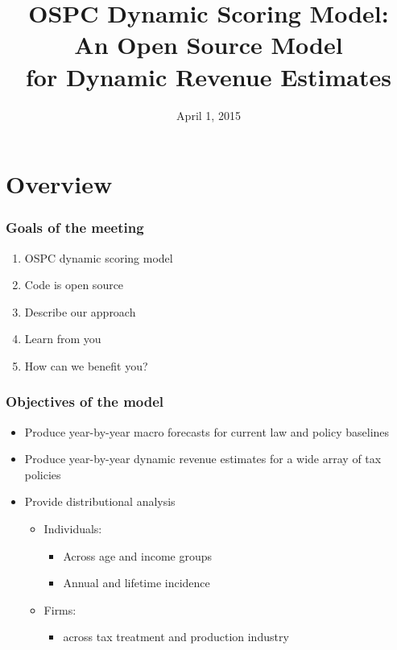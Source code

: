 \documentclass{beamer}
\title[OSPC Dynamic Scoring Model]
{OSPC Dynamic Scoring Model: \\
An Open Source Model \\ for Dynamic Revenue Estimates}
\date[Short Occasion] %
{April 1, 2015}
\begin{document}
\begin{frame}
  \titlepage
\end{frame}


\section{Overview}

\begin{frame}
\frametitle{Goals of the meeting}
  \begin{enumerate}
    \item OSPC dynamic scoring model
    \vspace{5mm}
    \item Code is open source
    \vspace{5mm}
    \item Describe our approach
    \vspace{5mm}
    \item Learn from you
    \vspace{5mm}
    \item How can we benefit you?
  \end{enumerate}
\end{frame}

\begin{frame}
\frametitle{Objectives of the model}
  \begin{itemize}
    \item Produce year-by-year macro forecasts for current law and policy baselines
    \vspace{3mm}
    \item Produce year-by-year dynamic revenue estimates for a wide array of tax policies
    \vspace{3mm}
    \item Provide distributional analysis
      \vspace{2mm}
    	\begin{itemize}
        \item Individuals:
    		  \begin{itemize}
    		    \item Across age and income groups
    		    \vspace{1mm}
            \item Annual and lifetime incidence
    		  \end{itemize}
        \vspace{2mm}
    	  \item Firms:
          \vspace{2mm}
          \begin{itemize}
            \item across tax treatment and production industry
          \end{itemize}
    	\end{itemize}
  \end{itemize}
\end{frame}
\end{document}
